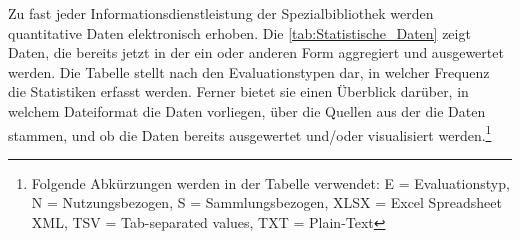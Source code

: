 Zu fast jeder Informationsdienstleistung der Spezialbibliothek werden quantitative Daten elektronisch erhoben. 
Die \autoref{tab:Statistische_Daten} zeigt Daten, die bereits jetzt in der ein oder anderen Form aggregiert und ausgewertet werden. 
Die Tabelle stellt nach den Evaluationstypen dar, in welcher Frequenz die Statistiken erfasst werden. Ferner bietet sie einen Überblick darüber, in welchem 
Dateiformat die Daten vorliegen, über die Quellen aus der die Daten stammen, und ob die Daten bereits ausgewertet und/oder visualisiert werden.\footnote{ Folgende
Abkürzungen werden in der Tabelle verwendet: E = Evaluationstyp, N = Nutzungsbezogen, S = Sammlungsbezogen, XLSX = Excel Spreadsheet XML, TSV = Tab-separated values, TXT = Plain-Text}


\begingroup
\setlength{\tabcolsep}{4pt} %

